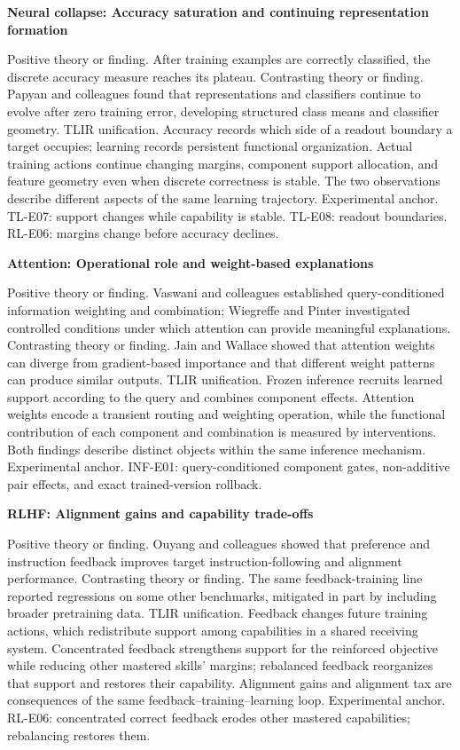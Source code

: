 \documentclass[12pt,letterpaper]{article}
\begin{document}
\noindent\textbf{Neural collapse: Accuracy saturation and continuing representation formation}\par
Positive theory or finding. After training examples are correctly classified, the discrete accuracy measure reaches its plateau.
Contrasting theory or finding. Papyan and colleagues found that representations and classifiers continue to evolve after zero training error, developing structured class means and classifier geometry. \cite{papyan2020}
TLIR unification. Accuracy records which side of a readout boundary a target occupies; learning records persistent functional organization. Actual training actions continue changing margins, component support allocation, and feature geometry even when discrete correctness is stable. The two observations describe different aspects of the same learning trajectory.
Experimental anchor. TL-E07: support changes while capability is stable. TL-E08: readout boundaries. RL-E06: margins change before accuracy declines.

\noindent\textbf{Attention: Operational role and weight-based explanations}\par
Positive theory or finding. Vaswani and colleagues established query-conditioned information weighting and combination; Wiegreffe and Pinter investigated controlled conditions under which attention can provide meaningful explanations. \cite{vaswani2017,wiegreffe2019}
Contrasting theory or finding. Jain and Wallace showed that attention weights can diverge from gradient-based importance and that different weight patterns can produce similar outputs. \cite{jain2019}
TLIR unification. Frozen inference recruits learned support according to the query and combines component effects. Attention weights encode a transient routing and weighting operation, while the functional contribution of each component and combination is measured by interventions. Both findings describe distinct objects within the same inference mechanism.
Experimental anchor. INF-E01: query-conditioned component gates, non-additive pair effects, and exact trained-version rollback.

\noindent\textbf{RLHF: Alignment gains and capability trade-offs}\par
Positive theory or finding. Ouyang and colleagues showed that preference and instruction feedback improves target instruction-following and alignment performance. \cite{ouyang2022}
Contrasting theory or finding. The same feedback-training line reported regressions on some other benchmarks, mitigated in part by including broader pretraining data.
TLIR unification. Feedback changes future training actions, which redistribute support among capabilities in a shared receiving system. Concentrated feedback strengthens support for the reinforced objective while reducing other mastered skills' margins; rebalanced feedback reorganizes that support and restores their capability. Alignment gains and alignment tax are consequences of the same feedback--training--learning loop.
Experimental anchor. RL-E06: concentrated correct feedback erodes other mastered capabilities; rebalancing restores them.
\end{document}
